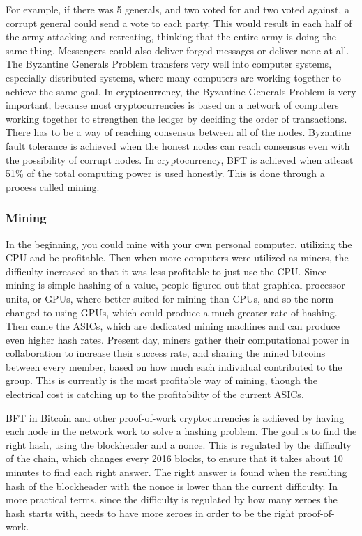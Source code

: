 \documentclass[11pt]{article}
\begin{document}
For example, if there was 5 generals, and two voted for and two voted against, a corrupt general could send a vote to each party. This would result in each half of the army attacking and retreating, thinking that the entire army is doing the same thing.  Messengers could also deliver forged messages or deliver none at all. The Byzantine Generals Problem transfers very well into computer systems, especially distributed systems, where many computers are working together to achieve the same goal. In cryptocurrency, the Byzantine Generals Problem is very important, because most cryptocurrencies is based on a network of computers working together to strengthen the ledger by deciding the order of transactions. There has to be a way of reaching consensus between all of the nodes. Byzantine fault tolerance is achieved when the honest nodes can reach consensus even with the possibility of corrupt nodes. In cryptocurrency, BFT is achieved when atleast 51\% of the total computing power is used honestly. This is done through a process called mining.
 
\subsubsection{Mining}

In the beginning, you could mine with your own personal computer, utilizing the CPU and be profitable. Then when more computers were utilized as miners, the difficulty increased so that it was less profitable to just use the CPU. Since mining is  simple hashing of a value, people figured out that graphical processor units, or GPUs, where better suited for mining than CPUs, and so the norm changed to using GPUs, which could produce a much greater rate of hashing. Then came the ASICs, which are dedicated mining machines and can produce even higher hash rates. Present day, miners gather their computational power in collaboration to increase their success rate, and sharing the mined bitcoins between every member, based on how much each individual contributed to the group. This is currently is the most profitable way of mining, though the electrical cost is catching up to the profitability of the current ASICs.

BFT in Bitcoin and other proof-of-work cryptocurrencies is achieved by having each node in the network work to solve a hashing problem. The goal is to find the right hash, using the blockheader and a nonce. This is regulated by the difficulty of the chain, which changes every 2016 blocks, to ensure that it takes about 10 minutes to find each right answer. The right answer is found when the resulting hash of the blockheader with the nonce is lower than the current difficulty. In more practical terms, since the difficulty is regulated by how many zeroes the hash starts with, needs to have more zeroes in order to be the right proof-of-work.
\end{document}
